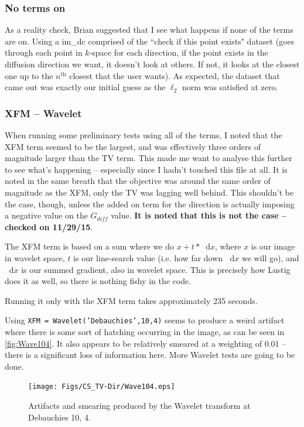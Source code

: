 \documentclass[11 pt]{article}
\newcommand*\diff{\mathop{}\!\mathrm{d}}
\begin{document}
    \subsubsection{No terms on}

      As a reality check, Brian suggested that I see what happens if none of the terms are on. Using a im\_dc comprised of the ``check if this point exists" dataset (goes through each point in $k$-space for each direction, if the point exists in the diffusion direction we want, it doesn't look at others. If not, it looks at the closest one up to the $n^\text{th}$ closest that the user wants). As expected, the dataset that came out was exactly our initial guess as the $\ell_2$ norm was satisfied at zero.

    \subsubsection{XFM -- Wavelet}

      When running some preliminary tests using all of the terms, I noted that the XFM term seemed to be the largest, and was effectively three orders of magnitude larger than the TV term. This made me want to analyse this further to see what's happening -- especially since I hadn't touched this file at all. It is noted in the same breath that the objective was around the same order of magnitude as the XFM, only the TV was lagging well behind. This shouldn't be the case, though, unless the added on term for the direction is actually imposing a negative value on the $G_{diff}$ value. \textbf{It is noted that this is not the case -- checked on 11/29/15}.

      The XFM term is based on a sum where we do $x + t*\diff x$, where $x$ is our image in wavelet space, $t$ is our line-search value (i.e. how far down $\diff x$ we will go), and $\diff x$ is our summed gradient, also in wavelet space. This is precisely how Lustig does it as well, so there is nothing fishy in the code. 

      Running it only with the XFM term takes approximately 235 seconds.

      Using \texttt{XFM = Wavelet('Debauchies',10,4)} seems to produce a weird artifact where there is some sort of hatching occurring in the image, as can be seen in \autoref{fig:Wave104}.  It also appears to be relatively smeared at a weighting of 0.01 -- there is a significant loss of information here. More Wavelet tests are going to be done. 

      \begin{figure}[h] 

        \centering
        \vspace{0pt}
        \setlength\fboxsep{0pt}
        \setlength\fboxrule{0.5pt}
        \texttt{[image: Figs/CS\_TV-Dir/Wave104.eps]}
        \caption{Artifacts and smearing produced by the Wavelet transform at Debauchies 10, 4.}
        \label{fig:Wave104}

        \end{figure}
\end{document}
